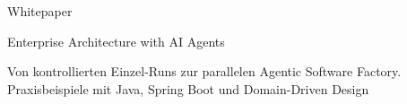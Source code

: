 \documentclass[12pt]{article}
\begin{document}
\begin{folie}{Whitepaper}
  \vspace{40pt}
  {\fontsize{34}{46}\selectfont\color{tintesek}Enterprise Architecture with
    AI Agents\par}
  \vspace{22pt}
  {\fontsize{27}{37}\selectfont\color{tintesek}Von kontrollierten
    Einzel-Runs zur parallelen Agentic Software Factory. Praxisbeispiele mit
    Java, Spring Boot und Domain-Driven Design\par}
  \vspace{52pt}
\end{folie}
\end{document}
